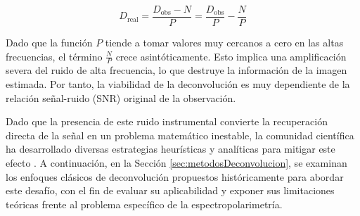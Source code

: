 \begin{equation}
    \label{eq:deconvolucionRuido}
    D_{\text{real}} = \frac{D_{\text{obs}} - N}{P} = \frac{D_{\text{obs}}}{P} - \frac{N}{P}
\end{equation}

Dado que la función $P$ tiende a tomar valores muy cercanos a cero en las altas frecuencias, el término $\frac{N}{P}$ crece asintóticamente. Esto implica una amplificación severa del ruido de alta frecuencia, lo que destruye la información de la imagen estimada. Por tanto, la viabilidad de la deconvolución es muy dependiente de la relación señal-ruido (SNR) original de la observación.

Dado que la presencia de este ruido instrumental convierte la recuperación directa de la señal en un problema matemático inestable, la comunidad científica ha desarrollado diversas estrategias heurísticas y analíticas para mitigar este efecto \cite{Lucy1974}. A continuación, en la Sección \ref{sec:metodosDeconvolucion}, se examinan los enfoques clásicos de deconvolución propuestos históricamente para abordar este desafío, con el fin de evaluar su aplicabilidad y exponer sus limitaciones teóricas frente al problema específico de la espectropolarimetría.